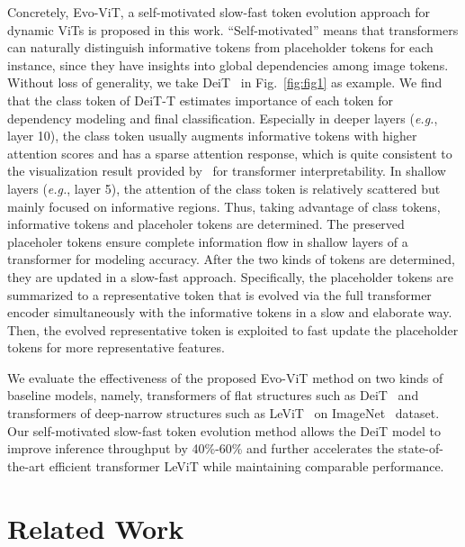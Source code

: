 \documentclass[letterpaper]{article} \usepackage{aaai22}  \usepackage{times}  \usepackage{helvet}  \usepackage{courier}  \usepackage[hyphens]{url}  \usepackage{graphicx} \urlstyle{rm} \def\UrlFont{\rm}  \usepackage{natbib}  \usepackage{caption} \DeclareCaptionStyle{ruled}{labelfont=normalfont,labelsep=colon,strut=off} \frenchspacing  \setlength{\pdfpagewidth}{8.5in}  \setlength{\pdfpageheight}{11in}  \usepackage{algorithm}
\begin{document}
 
Concretely, 
Evo-ViT, a self-motivated slow-fast token evolution approach for dynamic ViTs is proposed in this work. ``Self-motivated'' means that transformers can naturally distinguish informative tokens from placeholder tokens for each instance, since they have insights into global dependencies among image tokens. 
Without loss of generality, we take DeiT~\cite{DeiT} in Fig.~\ref{fig:fig1} as example. We find that the class token of DeiT-T estimates importance of each token for dependency modeling and final classification. Especially in deeper layers (\emph{e.g.}, layer 10), the class token usually augments informative tokens with higher attention scores and has a sparse attention response, which is quite consistent to the visualization result provided by~\cite{Trans_interpretability} for transformer interpretability. In shallow layers (\emph{e.g.}, layer 5), the attention of the class token is relatively scattered but mainly focused on informative regions. Thus, taking advantage of class tokens, informative tokens and placeholer tokens are determined. The preserved placeholer tokens ensure complete information flow in shallow layers of a transformer for modeling accuracy. 
After the two kinds of tokens are determined, they are updated in a slow-fast approach. Specifically, the placeholder tokens are summarized to a representative token that is evolved via the full transformer encoder simultaneously with the informative tokens in a slow and elaborate way. Then, the evolved representative token is exploited to fast update the placeholder tokens for more representative features.












We evaluate the effectiveness of the proposed Evo-ViT method on two kinds of baseline models, namely, transformers of flat structures such as DeiT~\cite{DeiT} and transformers of deep-narrow structures such as LeViT~\cite{LeViT} on ImageNet~\cite{imagenet} dataset.  Our self-motivated slow-fast token evolution method allows
the DeiT model to improve inference throughput by 40\%-60\% and further accelerates the state-of-the-art efficient transformer LeViT while maintaining comparable performance. 

%
 
\section{Related Work}
\end{document}
